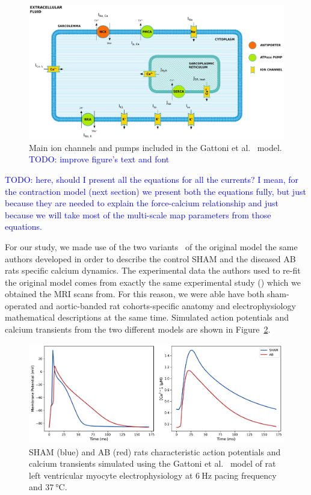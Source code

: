 \begin{figure}[!ht]
    \myfloatalign
    \includegraphics[width=\textwidth]{figures/chapter02/ep.pdf}
    \caption{Main ion channels and pumps included in the Gattoni et al.~\cite{Gattoni:2016} model. \textcolor{blue}{TODO: improve figure's text and font}}
    \label{fig:gattonicurrentsfig}
\end{figure}


\vspace{0.2cm}
\textcolor{blue}{TODO: here, should I present all the equations for all the currents? I mean, for the contraction model (next section) we present both the equations fully, but just because they are needed to explain the force-calcium relationship and just because we will take most of the multi-scale map parameters from those equations.}

\vspace{0.2cm}
For our study, we made use of the two variants~\cite{Gattoni:2017} of the original model the same authors developed in order to describe the control SHAM and the diseased AB rats specific calcium dynamics. The experimental data the authors used to re-fit the original model comes from exactly the same experimental study (\cite{Roe:2017}) which we obtained the MRI scans from. For this reason, we were able have both sham-operated and aortic-banded rat cohorts-specific anatomy and electrophysiology mathematical descriptions at the same time. Simulated action potentials and calcium transients from the two different models are shown in Figure~\ref{fig:shamvsabcaap}.

\begin{figure}[!ht]
    \myfloatalign
    \includegraphics[width=\textwidth]{figures/chapter02/sham_vs_ab_ca_ap.pdf}
    \caption{SHAM (blue) and AB (red) rats characteristic action potentials and calcium transients simulated using the Gattoni et al.~\cite{Gattoni:2017} model of rat left ventricular myocyte electrophysiology at $\SI{6}{\hertz}$ pacing frequency and $\SI{37}{\celsius}$.}
    \label{fig:shamvsabcaap}
\end{figure}

